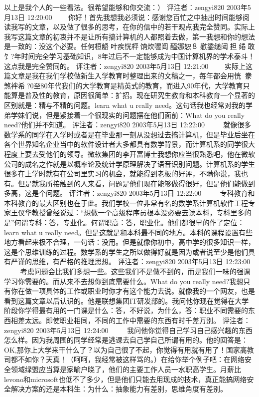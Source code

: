 以上是我个人的一些看法。很希望能够和你交流：）
评注者：zengyi820	2003年5月13日 12:20:00
　　你好！首先我想我必须说：感谢您百忙之中抽出时间能够阅读我写的文章，以及做了很多的思考，在你的信中的若干观点我完全赞同。实际上我写这篇文章的初衷并不是让所有搞计算机的人都照着去做，第一我想和你的想法是一致的：没这个必要。任何桓龉叶疾恍枰饷炊喔阊醯娜恕８慰鋈缒闼担绻敢饣?年时间完全学习基础知识，8年过后不一定能够成为中国计算机界的学术泰斗！这点我是完全赞同的。
评注者：zengyi820	2003年5月13日 12:21:00
　　实际上这篇文章是我在我们学校做新生入学教育时整理出来的文稿之一，每年都会用恍２豢煞袢希?0至80年代我们的大学教育是精英式的教育，而进入90年代，大学教育只能算是普及性的教育，原因很简单：扩招。现在研究生教育和本科教育一个显著的区别就是：精与不精的问题。learn what u really need。这句话我也经常对我的学弟学妹们说，但是紧接着一个很现实的问题摆在他们面前：What do you really need?他们并不知道。
评注者：zengyi820	2003年5月13日 12:22:00
　　 就像很多数学系的同学在入学时或者是在毕业那一刻从没想过去搞计算机，但是毕业后坐在各个世界知名企业当中的软件设计者大多都具有数学背景，而计算机系的同学很大程度上要去受他们的领导。微软集团的李开富博士我想你应当很熟悉吧，他在微软公司的成名之作就是以概率论及统计学原理解决了语音识别问题。计算机系的学生很多在上学时就有在公司里实习的机会，就能得到老板的好评，不瞒你说，我也有。但是就我所接触到的人来看，问题是他们现在能够做得很好，但是他们能做到多高，这是个问题。
评注者：zengyi820	2003年5月13日 12:22:00
　　 专科教育和本科教育的最大区别也在于此。我们学校一位非常有名的数学系计算机软件工程专家王仪华教授曾经说过：“想做一个高级程序员根本没必要去读本科，专科里多的是”何谓专科：答，专业化。何谓职高：答，职业化。他们都很早的作了定位：learn what u really need。但是这就是和本科最不同的地方。本科的课程设置有些地方看起来极不合理，一句话：没用。但是就像你初中，高中学的很多知识一样，这是个思维训练的过程。数学系的学生之所以做得好就是因为或者说至少是他们具有严谨的思维，有严格的推理思想。
评注者：zengyi820	2003年5月13日 12:23:00
　　 考虑问题会比我们多想一些。这些我们不是做不到的，而是我们一味的强调学习你需要的。而从来不去想你到底需要什么。What do you really need?我想只有你在做一项具体的工作或职业时你才有这个能力去说。就像我的一个网友，也是看到这篇文章以后认识的。他是联想集团IT研发部的。我问他你现在觉得在大学阶段你学得最有用的一门课是什么：答，不好说，为什么，答：职业不同需要的东西相差太远。即使职业相同，不同的工作中需要的东西有时千差万别。
评注者：zengyi820	2003年5月13日 12:24:00
　　 我问他你觉得自己学习自己感兴趣的东西怎么样。因为我周围的同学经常是逃课去自己学自己所谓有用的。他的回答是：OK,那你上大学来干什么了？以为自己很了不起，你觉得有用就有用了！国家高教司都不如你？天真！（呵呵，我经常被这样骂的。）在给你举个例子吧：在网络安全领域绿盟应当算是家喻户晓了，他们的主要工作人员一水职高学生。月薪比levono和microsoft也低不了多少，但是他们只能去用现成的技术，真正能搞网络安全解决方案的还是本科生：为什么：抽象能力有差别，思维角度有差别。
